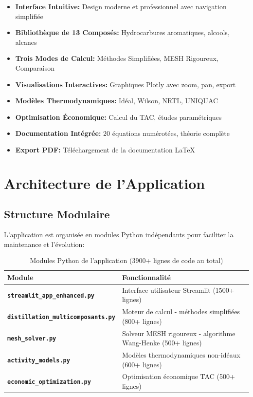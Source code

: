 \documentclass[11pt,a4paper]{article}
\newcommand{\file}[1]{\texttt{\textbf{#1}}}
\begin{document}
\begin{tcolorbox}[colback=blue!5,colframe=blue!50!black,title=Fonctionnalités Clés]
\begin{itemize}[leftmargin=*]
    \item \textbf{Interface Intuitive:} Design moderne et professionnel avec navigation simplifiée
    \item \textbf{Bibliothèque de 13 Composés:} Hydrocarbures aromatiques, alcools, alcanes
    \item \textbf{Trois Modes de Calcul:} Méthodes Simplifiées, MESH Rigoureux, Comparaison
    \item \textbf{Visualisations Interactives:} Graphiques Plotly avec zoom, pan, export
    \item \textbf{Modèles Thermodynamiques:} Idéal, Wilson, NRTL, UNIQUAC
    \item \textbf{Optimisation Économique:} Calcul du TAC, études paramétriques
    \item \textbf{Documentation Intégrée:} 20 équations numérotées, théorie complète
    \item \textbf{Export PDF:} Téléchargement de la documentation LaTeX
\end{itemize}
\end{tcolorbox}

\section{Architecture de l'Application}

\subsection{Structure Modulaire}

L'application est organisée en modules Python indépendants pour faciliter la maintenance et l'évolution:

\begin{table}[h]
\centering
\small
\begin{tabular}{p{5cm}p{9cm}}
\toprule
\textbf{Module} & \textbf{Fonctionnalité} \\
\midrule
\file{streamlit\_app\_enhanced.py} & Interface utilisateur Streamlit (1500+ lignes) \\
\file{distillation\_multicomposants.py} & Moteur de calcul - méthodes simplifiées (800+ lignes) \\
\file{mesh\_solver.py} & Solveur MESH rigoureux - algorithme Wang-Henke (500+ lignes) \\
\file{activity\_models.py} & Modèles thermodynamiques non-idéaux (600+ lignes) \\
\file{economic\_optimization.py} & Optimisation économique TAC (500+ lignes) \\
\bottomrule
\end{tabular}
\caption{Modules Python de l'application (3900+ lignes de code au total)}
\end{table}
\end{document}
